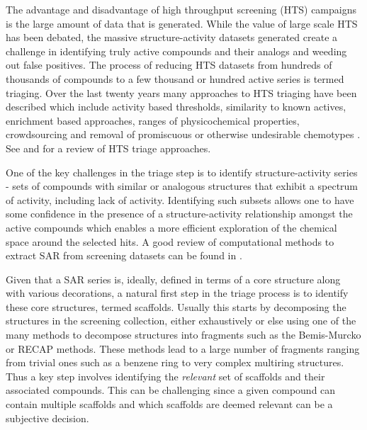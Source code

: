 \documentclass[journal=jacsat,manuscript=article]{achemso}
\begin{document}
The advantage and disadvantage of high throughput screening (HTS)
campaigns is the large amount of data that is generated. While the
value of large scale HTS has been debated\cite{Macarron:2011qv}, the
massive structure-activity datasets generated create a challenge in
identifying truly active compounds and their analogs and weeding out
false positives. The process of reducing HTS datasets from hundreds of
thousands of compounds to a few thousand or hundred active series is
termed triaging. Over the last twenty years many approaches to HTS
triaging have been described which include activity based
thresholds\cite{Mulrooney:2013aa}, similarity to known
actives\cite{Shanmugasundaram:2005aa}, enrichment based
approaches\cite{Varin2010CSE,Pu:2012wf}, ranges of physicochemical
properties\cite{Cox:2012qy}, crowdsourcing\cite{Peng:2013qp} and
removal of promiscuous or otherwise undesirable chemotypes
\cite{Dahlin:2014fp}. See \citeauthor{Shun:2011sy} and
\citeauthor{Langer:2009mw} for a review of HTS triage approaches.

One of the key challenges in the triage step is to identify structure-activity
series - sets of compounds with similar or analogous structures that exhibit a
spectrum of activity, including lack of activity. Identifying such subsets allows one to have some
confidence in the presence of a structure-activity relationship amongst the
active compounds which enables a more efficient exploration of the chemical
space around the selected hits. A good review of computational methods to extract SAR from screening datasets can be found in \citeauthor{Wawer2010review}. 

Given that a SAR series is, ideally, defined in terms of a core structure along
with various decorations, a natural first step in the triage process is to
identify these core structures, termed scaffolds. Usually this starts by
decomposing the structures in the screening collection, either exhaustively or
else using one of the many methods to decompose structures into fragments such
as the Bemis-Murcko\cite{BemisMurcko1999,BemisMurcko1996} or RECAP
methods\cite{Lewell:1998aa}. These methods lead to a large number of
fragments ranging from trivial ones such as a benzene ring to very complex
multiring structures. Thus a key step involves identifying the \emph{relevant} set of
scaffolds and their associated compounds. This can be challenging since a given
compound can contain multiple scaffolds and which scaffolds are
deemed relevant can be a subjective decision\cite{Hu:2016aa}.
\end{document}
